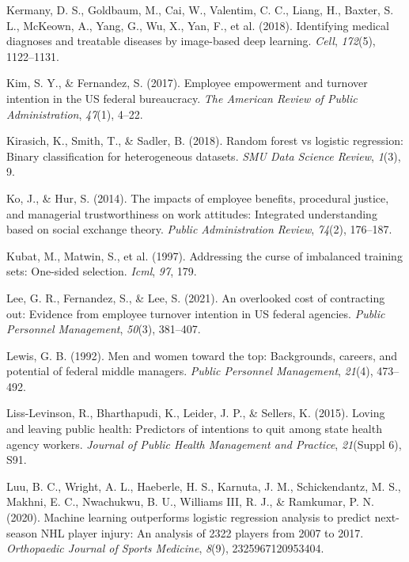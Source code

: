 \documentclass[
  man]{apa7}
\newlength{\cslhangindent}
\newlength{\cslentryspacingunit} %
\newenvironment{CSLReferences}[2] %
 {%
  \setlength{\parindent}{0pt}
  \ifodd #1
  \let\oldpar\par
  \def\par{\hangindent=\cslhangindent\oldpar}
  \fi
  \setlength{\parskip}{#2\cslentryspacingunit}
 }%
 {}
\begin{document}
\begin{CSLReferences}{1}{0}
\leavevmode{}%
Kermany, D. S., Goldbaum, M., Cai, W., Valentim, C. C., Liang, H., Baxter, S. L., McKeown, A., Yang, G., Wu, X., Yan, F., et al. (2018). Identifying medical diagnoses and treatable diseases by image-based deep learning. \emph{Cell}, \emph{172}(5), 1122--1131.

\leavevmode{}%
Kim, S. Y., \& Fernandez, S. (2017). Employee empowerment and turnover intention in the US federal bureaucracy. \emph{The American Review of Public Administration}, \emph{47}(1), 4--22.

\leavevmode{}%
Kirasich, K., Smith, T., \& Sadler, B. (2018). Random forest vs logistic regression: Binary classification for heterogeneous datasets. \emph{SMU Data Science Review}, \emph{1}(3), 9.

\leavevmode{}%
Ko, J., \& Hur, S. (2014). The impacts of employee benefits, procedural justice, and managerial trustworthiness on work attitudes: Integrated understanding based on social exchange theory. \emph{Public Administration Review}, \emph{74}(2), 176--187.

\leavevmode{}%
Kubat, M., Matwin, S., et al. (1997). Addressing the curse of imbalanced training sets: One-sided selection. \emph{Icml}, \emph{97}, 179.

\leavevmode{}%
Lee, G. R., Fernandez, S., \& Lee, S. (2021). An overlooked cost of contracting out: Evidence from employee turnover intention in US federal agencies. \emph{Public Personnel Management}, \emph{50}(3), 381--407.

\leavevmode{}%
Lewis, G. B. (1992). Men and women toward the top: Backgrounds, careers, and potential of federal middle managers. \emph{Public Personnel Management}, \emph{21}(4), 473--492.

\leavevmode{}%
Liss-Levinson, R., Bharthapudi, K., Leider, J. P., \& Sellers, K. (2015). Loving and leaving public health: Predictors of intentions to quit among state health agency workers. \emph{Journal of Public Health Management and Practice}, \emph{21}(Suppl 6), S91.

\leavevmode{}%
Luu, B. C., Wright, A. L., Haeberle, H. S., Karnuta, J. M., Schickendantz, M. S., Makhni, E. C., Nwachukwu, B. U., Williams III, R. J., \& Ramkumar, P. N. (2020). Machine learning outperforms logistic regression analysis to predict next-season NHL player injury: An analysis of 2322 players from 2007 to 2017. \emph{Orthopaedic Journal of Sports Medicine}, \emph{8}(9), 2325967120953404.


\end{CSLReferences}
\end{document}
